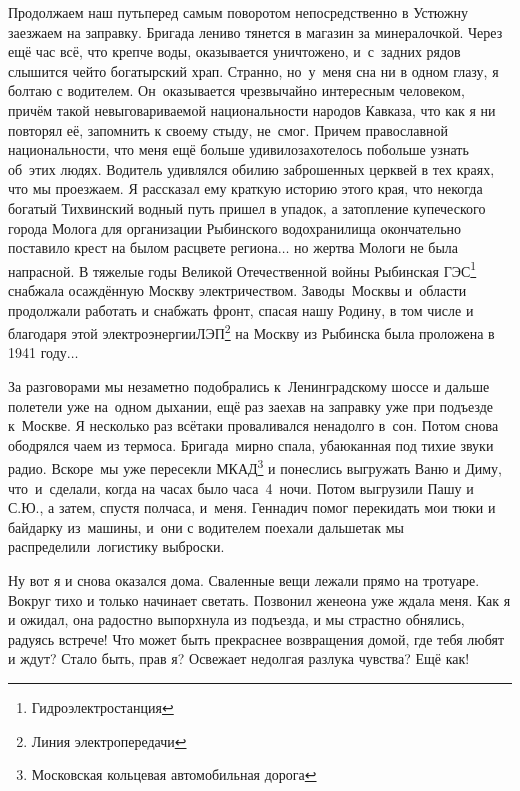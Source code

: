 \renewcommand*{\thefootnote}{\arabic{footnote}}
Продолжаем наш путь\mdash перед самым поворотом непосредственно в Устюжну заезжаем на заправку. Бригада лениво тянется в магазин за минералочкой. Через ещё час всё, что крепче воды, оказывается уничтожено, и~с~задних рядов слышится чей\sdash то богатырский храп. Странно, но~у~меня сна ни в одном глазу, я болтаю с водителем. Он~оказывается чрезвычайно интересным человеком, причём такой невыговариваемой национальности народов Кавказа, что как я ни повторял её, запомнить к своему стыду, не~смог. Причем православной национальности, что меня ещё больше удивило\mdash захотелось побольше узнать об~этих людях. Водитель удивлялся обилию заброшенных церквей в тех краях, что мы проезжаем. Я рассказал ему краткую историю этого края, что некогда богатый Тихвинский водный путь пришел в упадок, а затопление купеческого города Молога для организации Рыбинского водохранилища окончательно поставило крест на былом расцвете региона$\ldots$ но жертва Мологи не была напрасной. В тяжелые годы Великой Отечественной войны Рыбинская ГЭС\footnote{Гидроэлектростанция} снабжала осаждённую Москву электричеством. Заводы~Москвы и~области продолжали работать и снабжать фронт, спасая нашу Родину, в том числе и благодаря этой электроэнергии\mdash ЛЭП\footnote{Линия электропередачи} на Москву из Рыбинска была проложена в 1941 году$\ldots$ 

За разговорами мы незаметно подобрались к~Ленинградскому шоссе и дальше полетели уже на~одном дыхании, ещё раз заехав на заправку уже при подъезде к~Москве. Я несколько раз всё\sdash таки проваливался ненадолго в~сон. Потом снова ободрялся чаем из термоса. Бригада~мирно спала, убаюканная под тихие звуки радио. Вскоре~мы уже пересекли МКАД\footnote{Московская кольцевая автомобильная дорога} и понеслись выгружать Ваню и Диму, что~и~сделали, когда на часах было часа~4~ночи. Потом выгрузили Пашу и С.Ю., а затем, спустя полчаса, и~меня. Геннадич помог перекидать мои тюки и байдарку из~машины, и~они с водителем поехали дальше\mdash так мы распределили~логистику выброски. 

Ну вот я и снова оказался дома. Сваленные вещи лежали прямо на тротуаре. Вокруг тихо и только начинает светать. Позвонил жене\mdash она уже ждала меня. Как я и ожидал, она радостно выпорхнула из подъезда, и мы страстно обнялись, радуясь встрече! Что может быть прекраснее возвращения домой, где тебя любят и ждут? Стало быть, прав я? Освежает недолгая разлука чувства? Ещё как! 

\begin{center}
\end{center}

